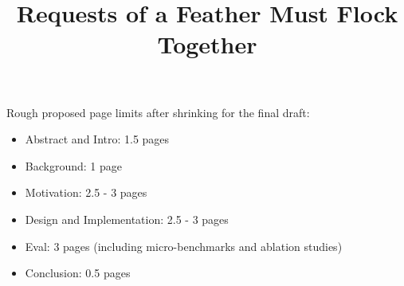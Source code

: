 \documentclass[sigplan,anonymous,review,nonacm]{acmart}
\begin{document}
\title{Requests of a Feather Must Flock Together}


 

\maketitle

\textcolor[RGB]{128,0,128}{Rough proposed page limits after shrinking for the final draft:
\begin{itemize}
    \item Abstract and Intro: 1.5 pages
    \item Background: 1 page
    \item Motivation: 2.5 - 3 pages
    \item Design and Implementation: 2.5 - 3 pages
    \item Eval: 3 pages (including micro-benchmarks and ablation studies)
    \item Conclusion: 0.5 pages
\end{itemize}
}

















\end{document}
